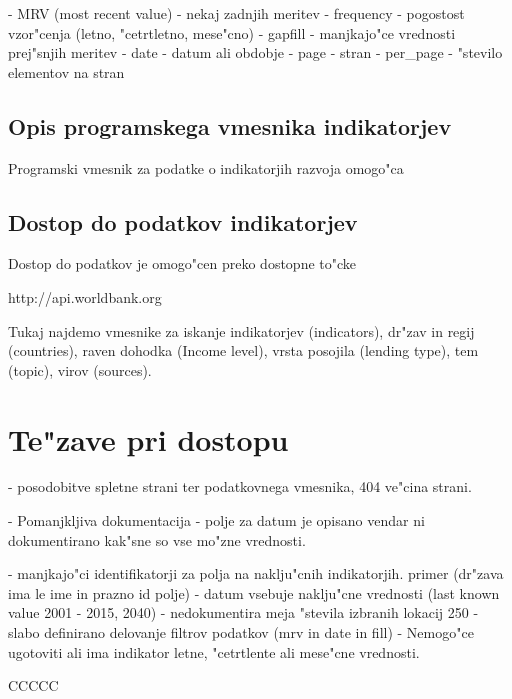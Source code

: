 - MRV (most recent value) - nekaj zadnjih meritev
- frequency - pogostost vzor"cenja (letno, "cetrtletno, mese"cno)
- gapfill - manjkajo"ce vrednosti prej"snjih meritev
- date - datum ali obdobje
- page - stran
- per\_page - "stevilo elementov na stran








\subsection{Opis programskega vmesnika indikatorjev}


Programski vmesnik za podatke o indikatorjih razvoja omogo"ca 


\subsection{Dostop do podatkov indikatorjev}

Dostop do podatkov je omogo"cen preko dostopne to"cke

http://api.worldbank.org

Tukaj najdemo vmesnike za iskanje indikatorjev (indicators), dr"zav in regij
(countries), raven dohodka (Income level), vrsta posojila (lending type), tem
(topic), virov (sources).





\section{Te"zave pri dostopu}

- posodobitve spletne strani ter podatkovnega vmesnika, 404 ve"cina strani.

- Pomanjkljiva dokumentacija
    - polje za datum je opisano vendar ni dokumentirano kak"sne so vse mo"zne
      vrednosti. 

- manjkajo"ci identifikatorji za polja na naklju"cnih indikatorjih.
  primer (dr"zava ima le ime in prazno id polje)
- datum vsebuje naklju"cne vrednosti (last known value 2001 - 2015, 2040)
- nedokumentira meja "stevila izbranih lokacij 250
- slabo definirano delovanje filtrov podatkov (mrv in date in fill)
- Nemogo"ce ugotoviti ali ima indikator letne, "cetrtlente ali mese"cne vrednosti.



CCCCC
